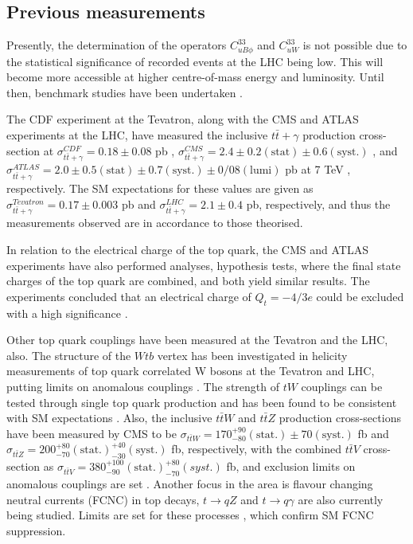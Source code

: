 \subsection{Previous measurements}

Presently, the determination of the operators $C^{33}_{uB\phi}$ and $C^{33}_{uW}$ is not possible due to the statistical significance of recorded events at the LHC being low. This will become more accessible at higher centre-of-mass energy and luminosity. Until then, benchmark studies have been undertaken \cite{photonbackgrounds}.

The CDF experiment at the Tevatron, along with the CMS and ATLAS experiments at the LHC, have measured the inclusive $t\bar{t}+\gamma$ production cross-section at $\sigma^{CDF}_{t\bar{t}+\gamma} = 0.18 \pm 0.08$ pb \cite{CDFttgamma}, $\sigma^{CMS}_{t\bar{t}+\gamma} = 2.4 \pm 0.2 (\text{stat}) \pm 0.6 (\text{syst.})$ \cite{CMS-PAS-TOP-13-011}, and $\sigma^{ATLAS}_{t\bar{t}+\gamma} = 2.0 \pm 0.5 (\text{stat}) \pm 0.7 (\text{syst.}) \pm 0/08 (\text{lumi})$ pb at 7 TeV \cite{ATLASttgamma}, respectively. The SM expectations for these values are given as $\sigma^{Tevatron}_{t\bar{t}+\gamma} = 0.17 \pm 0.003$ pb and $\sigma^{LHC}_{t\bar{t}+\gamma} = 2.1 \pm 0.4$ pb, respectively, and thus the measurements observed are in accordance to those theorised. 

In relation to the electrical charge of the top quark, the CMS and ATLAS experiments have also performed analyses, hypothesis tests, where the final state charges of the top quark are combined, and both yield similar results. The experiments concluded that an electrical charge of $Q_t = -4/3e$ could be excluded  with a high significance \cite{topchargeconstraints, ATLAStopcharge}.

Other top quark couplings have been measured at the Tevatron and the LHC, also. The structure of the $Wtb$ vertex has been investigated in 
helicity measurements of top quark correlated W bosons at the Tevatron and LHC, putting limits on anomalous couplings \cite{CDFD0combination, 
Whelicitytoppair, Wpolarisation}. The strength of $tW$ couplings can be tested through single top quark production and has been found to be 
consistent with SM expectations \cite{tsinglet, singlet}. Also, the inclusive $t\bar{t}W$ and $t\bar{t}Z$ production cross-sections have been 
measured by CMS to be $\sigma_{t\bar{t}W} = 170^{+90}_{-80}(\text{stat}.) \pm 70(\text{syst}.)$ fb and $\sigma_{t\bar{t}Z} = 200^{+80}_{-70}(\text{stat}.) ^{+40}_{-30}(\text{syst}.)$ fb, respectively, with the combined $t\bar{t}V$ cross-section as $\sigma_{t\bar{t}V} = 380^{+100}_{-90}
(\text{stat}.)^{+80}_{-70}(syst.) $ fb, and exclusion limits on anomalous couplings are set \cite{Khachatryan:1712680}. Another focus in the 
area is flavour changing neutral currents (FCNC) in top decays, $t \to qZ$ and $t \to q\gamma$ are also currently being studied. Limits are set 
for these processes \cite{tqZ, FCNC}, which confirm SM FCNC suppression. 

